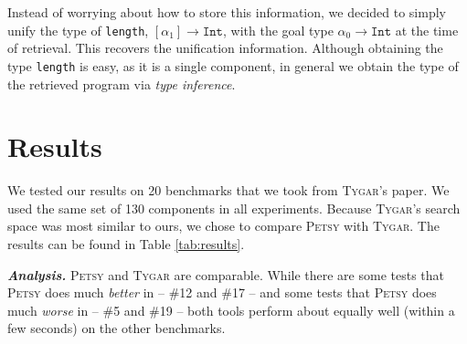 \documentclass[acmsmall,nonacm]{acmart}
\begin{document}
Instead of worrying about how to store this information,
we decided to simply unify the type of \texttt{length}, $[\alpha_1] \to \texttt{Int}$,
with the goal type $\alpha_0 \to \texttt{Int}$
at the time of retrieval. This recovers the unification information.
Although obtaining the type \texttt{length} is easy, as it is a single component,
in general we obtain the type of the retrieved program via \textit{type inference}.



\section{Results}



We tested our results on 20 benchmarks that we took from \textsc{Tygar}'s \cite{tygar} paper. 
We used the same set of 130 components in all experiments. Because \textsc{Tygar}'s search 
space was most similar to ours, we chose to compare \textsc{Petsy} with \textsc{Tygar}.
The results can be found in Table \ref{tab:results}.



\vspace{2mm}
\noindent \textbf{\textit{Analysis.}} 
\textsc{Petsy} and \textsc{Tygar} are comparable.
While there are some tests that \textsc{Petsy} does much \textit{better} in -- \#12 and \#17 --
and some tests that \textsc{Petsy} does much \textit{worse} in -- \#5 and \#19 -- both tools perform
about equally well (within a few seconds) on the other benchmarks.

\end{document}

